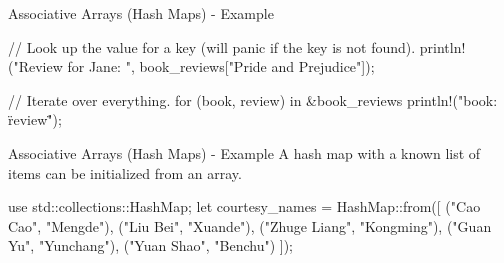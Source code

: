 \documentclass[10pt,xcolor={dvipsnames}, aspectratio=169]{beamer}
\begin{document}
\begin{frame}[fragile]{Associative Arrays (Hash Maps) - Example}
	        \begin{rustcode}
// Look up the value for a key (will panic if the key is not found).
println!("Review for Jane: {}", book_reviews["Pride and Prejudice"]);

// Iterate over everything.
for (book, review) in &book_reviews {
    println!("{book}: \"{review}\"");
}

        \end{rustcode}
    \end{frame}
    \begin{frame}[fragile]{Associative Arrays (Hash Maps) - Example}
    A hash map with a known list of items can be initialized from an array. \\
	        \begin{rustcode}
use std::collections::HashMap;
let courtesy_names = HashMap::from([
    ("Cao Cao", "Mengde"),
    ("Liu Bei", "Xuande"),
    ("Zhuge Liang", "Kongming"),
    ("Guan Yu", "Yunchang"),
    ("Yuan Shao", "Benchu")
]);

        \end{rustcode}
    \end{frame}
\end{document}
